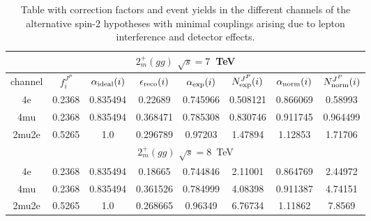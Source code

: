 \begin{table}[b]
\centering
\caption{
Table with correction factors and event yields in the different
channels of the alternative spin-2 hypotheses with minimal
couplings arising due to lepton interference and detector effects.}
\centering %
\begin{tabular}{c c c c c c c c} %
\hline \hline

 \multicolumn{8}{|c|}{$2^{+}_{m} (gg)$ $\sqrt{s}=7$~TeV} \\ \hline 

channel & $f_{i}^{J^P}$ & $\alpha_{\rm ideal} (i)$ & $\epsilon_{\rm reco} (i)$ & $\alpha_{\rm exp} (i)$ & $N^{J^P}_{\rm exp} (i)$ & $\alpha_{\rm norm} (i)$ & $N^{J^P}_{\rm norm} (i)$\\ \hline 
4e & 0.2368 & 0.835494 & 0.22689 & 0.745966
 & 0.508121%
 & 0.866069 & 0.58993 \\ \hline 4mu & 0.2368 & 0.835494 & 0.368471 & 0.785308
 & 0.830746%
 & 0.911745 & 0.964499 \\ \hline 2mu2e & 0.5265 & 1.0  & 0.296789 & 0.97203
 & 1.47894%
 & 1.12853 & 1.71706 \\ \hline \hline 

 \multicolumn{8}{|c|}{$2^{+}_{m} (gg)$ $\sqrt{s}=8$~TeV} \\ \hline 

4e & 0.2368 & 0.835494 & 0.18665 & 0.744846
 & 2.11001%
 & 0.864769 & 2.44972 \\ \hline 
4mu & 0.2368 & 0.835494 & 0.361526 & 0.784999
 & 4.08398%
 & 0.911387 & 4.74151 \\ \hline 
2mu2e & 0.5265 & 1.0  & 0.268665 & 0.96349
 & 6.76734%
 & 1.11862 & 7.8569 \\ \hline \hline 


\end{tabular}
\end{table}
